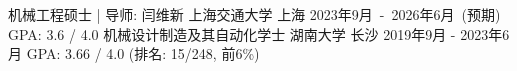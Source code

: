
\begin{cventries}
	\cventry
	{机械工程硕士 | 导师: 闫维新} %
	{上海交通大学} %
	{上海} %
	{2023年9月~-~2026年6月~(预期)} %
	{
        GPA: 3.6 / 4.0
	}%
	\cventry
	{机械设计制造及其自动化学士} %
	{湖南大学} %
	{长沙} %
	{2019年9月 - 2023年6月} %
	{
        GPA: 3.66 / 4.0 (排名: 15/248, 前6\%)
	}%
	\vspace{2mm}
\end{cventries}